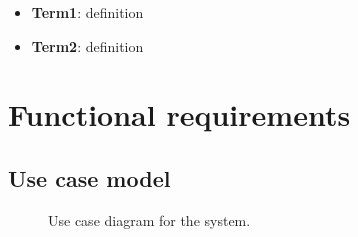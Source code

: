 \documentclass[a4paper,10pt]{article}
\begin{document}
\begin{itemize}
    \item \textbf{Term1}: definition
    \item \textbf{Term2}: definition
\end{itemize}

\section{Functional requirements}\label{sec:functional}
\subsection*{Use case model}

\begin{figure}[!htp]
    \centering
    \caption{Use case diagram for the system.}\label{fig:use_case_model}
\end{figure}
\end{document}
